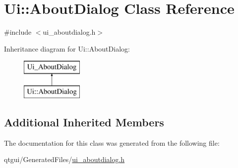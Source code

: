 \hypertarget{class_ui_1_1_about_dialog}{}\section{Ui\+::About\+Dialog Class Reference}
\label{class_ui_1_1_about_dialog}


{\ttfamily \#include $<$ui\+\_\+aboutdialog.\+h$>$}

Inheritance diagram for Ui\+::About\+Dialog\+:\begin{figure}[H]
\begin{center}
\leavevmode
\includegraphics[height=2.000000cm]{da/db9/class_ui_1_1_about_dialog}
\end{center}
\end{figure}
\subsection*{Additional Inherited Members}


The documentation for this class was generated from the following file\+:\begin{DoxyCompactItemize}
\item 
qtgui/\+Generated\+Files/\mbox{\hyperlink{ui__aboutdialog_8h}{ui\+\_\+aboutdialog.\+h}}\end{DoxyCompactItemize}
